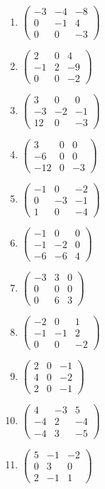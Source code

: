 \begin{enumerate}[label=\arabic*., leftmargin=*]
\item $\begin{pmatrix}-3 & -4 & -8\\ 0 & -1 & 4\\ 0 & 0 & -3\end{pmatrix}$
\item $\begin{pmatrix}2 & 0 & 4\\ -1 & 2 & -9\\ 0 & 0 & -2\end{pmatrix}$
\item $\begin{pmatrix}3 & 0 & 0\\ -3 & -2 & -1\\ 12 & 0 & -3\end{pmatrix}$
\item $\begin{pmatrix}3 & 0 & 0\\ -6 & 0 & 0\\ -12 & 0 & -3\end{pmatrix}$
\item $\begin{pmatrix}-1 & 0 & -2\\ 0 & -3 & -1\\ 1 & 0 & -4\end{pmatrix}$
\item $\begin{pmatrix}-1 & 0 & 0\\ -1 & -2 & 0\\ -6 & -6 & 4\end{pmatrix}$
\item $\begin{pmatrix}-3 & 3 & 0\\ 0 & 0 & 0\\ 0 & 6 & 3\end{pmatrix}$
\item $\begin{pmatrix}-2 & 0 & 1\\ -1 & -1 & 2\\ 0 & 0 & -2\end{pmatrix}$
\item $\begin{pmatrix}2 & 0 & -1\\ 4 & 0 & -2\\ 2 & 0 & -1\end{pmatrix}$
\item $\begin{pmatrix}4 & -3 & 5\\ -4 & 2 & -4\\ -4 & 3 & -5\end{pmatrix}$
\item $\begin{pmatrix}5 & -1 & -2\\ 0 & 3 & 0\\ 2 & -1 & 1\end{pmatrix}$
\end{enumerate}


